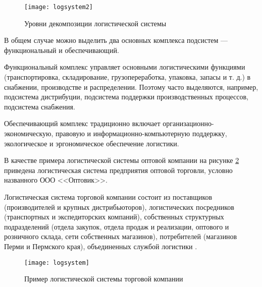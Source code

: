 \begin{figure}[h]
	\centering
	\texttt{[image: logsystem2]}
	\caption{Уровни декомпозиции логистической системы}
	\label{fig:logsystem2}
\end{figure}

В общем случае можно выделить два основных комплекса подсистем --- функциональный и обеспечивающий.

Функциональный комплекс управляет основными логистическими функциями (транспортировка, складирование, грузопереработка, упаковка, запасы и т. д.) в снабжении, производстве и распределении.
Поэтому часто выделяются, например, подсистема дистрибуции, подсистема поддержки производственных процессов, подсистема снабжения.

Обеспечивающий комплекс традиционно включает организационно-экономическую, правовую и информационно-компьютерную поддержку, экологическое и эргономическое обеспечение логистики.

В качестве примера логистической системы оптовой компании на рисунке \ref{fig:logsystem} приведена логистическая система предприятия оптовой торговли, условно названного ООО <<Оптовик>>.

Логистическая система торговой компании состоит из поставщиков (производителей и крупных дистрибьюторов), логистических посредников (транспортных и экспедиторских компаний), собственных структурных подразделений (отдела закупок, отдела продаж и реализации, оптового и розничного склада, сети собственных магазинов), потребителей (магазинов Перми и Пермского края), объединенных службой логистики \cite[с. 27--30]{sergeev2}.

\begin{figure}[!h]
	\centering
	\texttt{[image: logsystem]}
	\caption{Пример логистической системы торговой компании}
	\label{fig:logsystem}
\end{figure}

